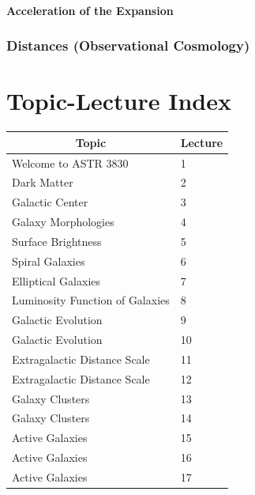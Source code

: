 \documentclass{book}
\begin{document}
\subsubsection{Acceleration of the Expansion}

\subsection{Distances (Observational Cosmology)}

\backmatter
\chapter{Topic-Lecture Index}
\begin{table}[H]
    \centering
    \begin{tabular}{|ll|}
        \hline
        \multicolumn{1}{|c}{Topic}      & Lecture \\ \hline \hline
        Welcome to ASTR 3830            & 1       \\ \hline
        Dark Matter                     & 2       \\ \hline
        Galactic Center                 & 3       \\ \hline
        Galaxy Morphologies             & 4       \\ \hline
        Surface Brightness              & 5       \\ \hline
        Spiral Galaxies                 & 6       \\ \hline
        Elliptical Galaxies             & 7       \\ \hline
        Luminosity Function of Galaxies & 8       \\ \hline
        Galactic Evolution              & 9       \\ \hline
        Galactic Evolution              & 10      \\ \hline
        Extragalactic Distance Scale    & 11      \\ \hline
        Extragalactic Distance Scale    & 12      \\ \hline
        Galaxy Clusters                 & 13      \\ \hline
        Galaxy Clusters                 & 14      \\ \hline
        Active Galaxies                 & 15      \\ \hline
        Active Galaxies                 & 16      \\ \hline
        Active Galaxies                 & 17      \\ \hline

\end{tabular}
\end{table}
\end{document}
